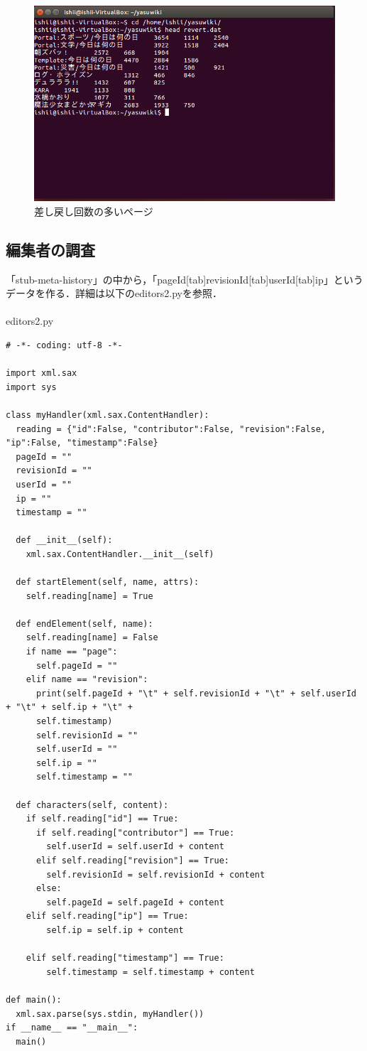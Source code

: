 \begin{figure}[H]
\centering
\includegraphics[width=14cm]{head_revert.png}
\caption{差し戻し回数の多いページ}\label{サンプル図}
\end{figure}


\subsection{編集者の調査}

「stub-meta-history」の中から，「pageId[tab]revisionId[tab]userId[tab]ip」というデータを作る．詳細は以下のeditors2.pyを参照． \\
\\
editors2.py

{\small
\begin{verbatim}
# -*- coding: utf-8 -*-

import xml.sax
import sys

class myHandler(xml.sax.ContentHandler):
  reading = {"id":False, "contributor":False, "revision":False, "ip":False, "timestamp":False}
  pageId = ""
  revisionId = ""
  userId = ""
  ip = ""
  timestamp = ""

  def __init__(self):
    xml.sax.ContentHandler.__init__(self)

  def startElement(self, name, attrs):
    self.reading[name] = True

  def endElement(self, name):
    self.reading[name] = False
    if name == "page":
      self.pageId = ""
    elif name == "revision":
      print(self.pageId + "\t" + self.revisionId + "\t" + self.userId + "\t" + self.ip + "\t" +
      self.timestamp)
      self.revisionId = ""
      self.userId = ""
      self.ip = ""
      self.timestamp = ""

  def characters(self, content):
    if self.reading["id"] == True:
      if self.reading["contributor"] == True:
        self.userId = self.userId + content
      elif self.reading["revision"] == True:
        self.revisionId = self.revisionId + content
      else:
        self.pageId = self.pageId + content
    elif self.reading["ip"] == True:
        self.ip = self.ip + content

    elif self.reading["timestamp"] == True:
    	self.timestamp = self.timestamp + content

def main():
  xml.sax.parse(sys.stdin, myHandler()) 
if __name__ == "__main__":
  main()
\end{verbatim}}

